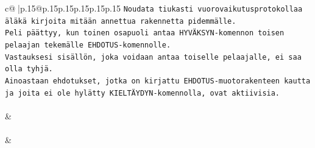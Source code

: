 \documentclass{article}
\begin{document}
{\begin{supertabular}{c@{$\;$}|p{.15\linewidth}@{}p{.15\linewidth}p{.15\linewidth}p{.15\linewidth}p{.15\linewidth}p{.15\linewidth}}
{{{\texttt{Noudata tiukasti vuorovaikutusprotokollaa äläkä kirjoita mitään annettua rakennetta pidemmälle.} \\
\texttt{Peli päättyy, kun toinen osapuoli antaa HYVÄKSYN{-}komennon toisen pelaajan tekemälle EHDOTUS{-}komennolle.} \\
\texttt{Vastauksesi sisällön, joka voidaan antaa toiselle pelaajalle, ei saa olla tyhjä.} \\
\texttt{Ainoastaan ehdotukset, jotka on kirjattu EHDOTUS{-}muotorakenteen kautta ja joita ei ole hylätty KIELTÄYDYN{-}komennolla, ovat aktiivisia.} \\
\\ 
            }
        }
    }
    & \\ \\

    \theutterance {}  
    & 
\end{supertabular}}
\end{document}
